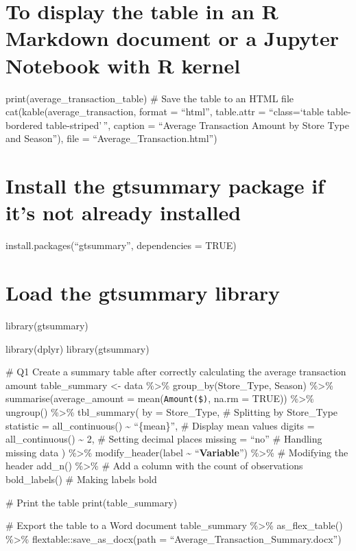 \documentclass[
]{article}
\begin{document}
\section{To display the table in an R Markdown document or a Jupyter
Notebook with R
kernel}\label{to-display-the-table-in-an-r-markdown-document-or-a-jupyter-notebook-with-r-kernel}

print(average\_transaction\_table) \# Save the table to an HTML file
cat(kable(average\_transaction, format = ``html'', table.attr =
``class=`table table-bordered table-striped'\,'', caption = ``Average
Transaction Amount by Store Type and Season''), file =
``Average\_Transaction.html'')

\section{Install the gtsummary package if it's not already
installed}\label{install-the-gtsummary-package-if-its-not-already-installed}

install.packages(``gtsummary'', dependencies = TRUE)

\section{Load the gtsummary library}\label{load-the-gtsummary-library}

library(gtsummary)

library(dplyr) library(gtsummary)

\# Q1 Create a summary table after correctly calculating the average
transaction amount table\_summary \textless- data \%\textgreater\%
group\_by(Store\_Type, Season) \%\textgreater\%
summarise(average\_amount = mean(\texttt{Amount(\$)}, na.rm = TRUE))
\%\textgreater\% ungroup() \%\textgreater\% tbl\_summary( by =
Store\_Type, \# Splitting by Store\_Type statistic = all\_continuous()
\textasciitilde{} ``\{mean\}'', \# Display mean values digits =
all\_continuous() \textasciitilde{} 2, \# Setting decimal places missing
= ``no'' \# Handling missing data ) \%\textgreater\%
modify\_header(label \textasciitilde{} ``\textbf{Variable}'')
\%\textgreater\% \# Modifying the header add\_n() \%\textgreater\% \#
Add a column with the count of observations bold\_labels() \# Making
labels bold

\# Print the table print(table\_summary)

\# Export the table to a Word document table\_summary \%\textgreater\%
as\_flex\_table() \%\textgreater\% flextable::save\_as\_docx(path =
``Average\_Transaction\_Summary.docx'')
\end{document}
